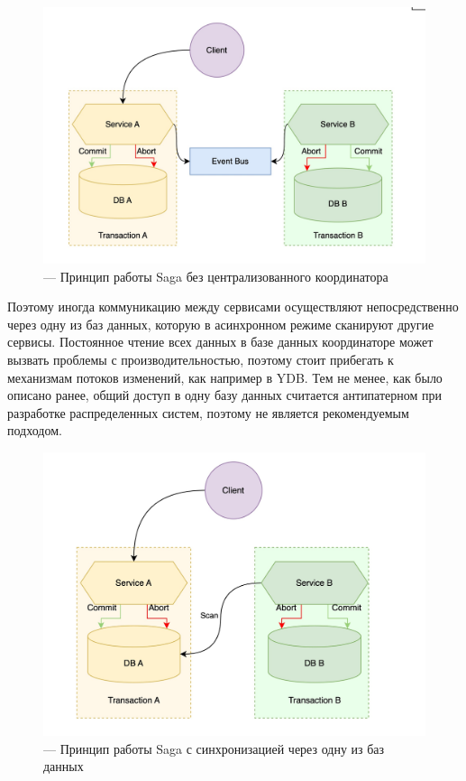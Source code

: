 \begin{figure}[H]
    \centering
    \includegraphics[width=0.8\linewidth]{img/saga_async.jpeg}
    \caption{--- Принцип работы Saga без централизованного координатора}
    \label{fig:saga_async}
\end{figure}

Поэтому иногда коммуникацию между сервисами осуществляют непосредственно через одну из баз данных, которую в асинхронном режиме
сканируют другие сервисы. Постоянное чтение всех данных в базе данных координаторе может вызвать проблемы с производительностью, поэтому 
стоит прибегать к механизмам потоков изменений, как например в YDB. Тем не менее, как было описано ранее, общий доступ в одну базу данных
считается антипатерном при разработке распределенных систем, поэтому не является рекомендуемым подходом.

\begin{figure}[H]
    \centering
    \includegraphics[width=0.8\linewidth]{img/saga_scan.jpeg}
    \caption{--- Принцип работы Saga с синхронизацией через одну из баз данных}
    \label{fig:saga_db}
\end{figure}

